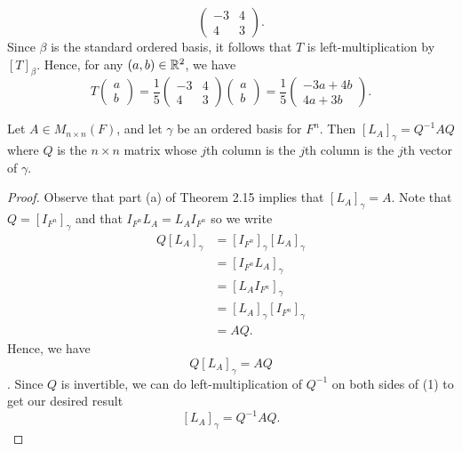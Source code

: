 \begin{eg}
\[\begin{pmatrix}
    -3 & 4 \\
    4 & 3 
\end{pmatrix}. \]
Since \( \beta \) is the standard ordered basis, it follows that \( T  \) is left-multiplication by \( [T]_{\beta}  \). Hence, for any \( (a,b) \in \mathbb{R}^{2} \), we have
\[ T \begin{pmatrix}
    a \\
    b
\end{pmatrix} = \frac{ 1 }{ 5 }  \begin{pmatrix}
-3 & 4 \\
4 & 3 
\end{pmatrix} \begin{pmatrix}
    a \\
    b 
\end{pmatrix} = \frac{ 1 }{ 5 }  \begin{pmatrix}
    -3a + 4b \\
    4a + 3b
\end{pmatrix}.  \]

\end{eg}
\begin{corollary}
   Let \( A \in {M}_{n \times n}(F) \), and let \( \gamma  \) be an ordered basis for \( F^{n}  \). Then \( [{L}_{A}]_{\gamma} = Q^{-1} A Q \) where \( Q  \) is the \( n \times n  \) matrix whose \( j \)th column is the \( j \)th column is the \( j \)th vector of \( \gamma \).
\end{corollary} 
\begin{proof}
Observe that part (a) of Theorem 2.15 implies that \( [{L}_{A}]_{\gamma} = A  \). Note that \( Q = [{I}_{F^{n}}]_{\gamma} \) and that \( {I}_{F^{n}}{L}_{A} = {L}_{A} {I}_{F^{n}}  \) so we write
\begin{align*}
    Q [{L}_{A}]_{\gamma} &= [{I}_{F^{n}}]_{\gamma} [{L}_{A}]_{\gamma}  \\
                         &= [{I}_{F^{n}} {L}_{A}]_{ \gamma} \\
                         &=  [{L}_{A} {I}_{F^{n}}]_{\gamma} \\
                         &=  [{L}_{A}]_{\gamma} [{I}_{F^{n}}]_{\gamma} \\
                         &= AQ.
\end{align*} 
Hence, we have \[ Q [{L}_{A}]_{\gamma} = AQ \tag{1} \]. Since \( Q  \) is invertible, we can do left-multiplication of \( Q^{-1} \) on both sides of (1) to get our desired result
\[  [{L}_{A}]_{\gamma} = Q^{-1} A Q. \]
\end{proof}

